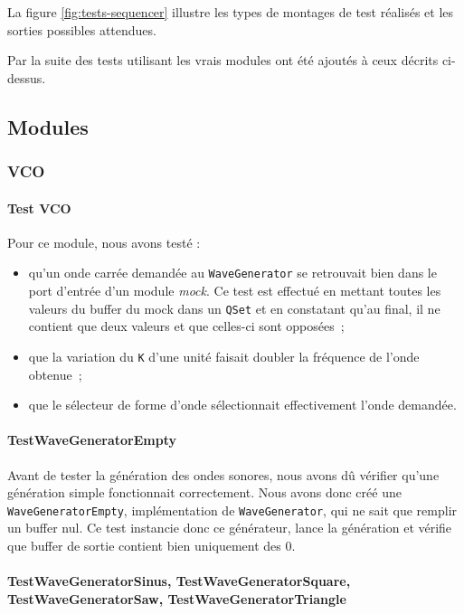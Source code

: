 La figure \ref{fig:tests-sequencer} illustre les types de montages de test réalisés et les sorties possibles
attendues.

Par la suite des tests utilisant les vrais modules ont été ajoutés à ceux décrits ci-dessus.

\subsection{Modules}


\subsubsection{VCO}

\paragraph{Test VCO}

Pour ce module, nous avons testé :
\begin{itemize}
    \item qu'un onde  carrée demandée au \texttt{WaveGenerator} se retrouvait bien dans le port d'entrée d'un module \textit{mock}. Ce test est effectué en mettant toutes les valeurs du buffer du mock dans un \verb!QSet! et en constatant qu'au final, il ne contient que deux valeurs et que celles-ci sont opposées~;
    \item que la variation du \texttt{K} d'une unité faisait doubler la fréquence de l'onde obtenue~;
    \item que le sélecteur de forme d'onde sélectionnait effectivement l'onde demandée.
\end{itemize}

\paragraph{TestWaveGeneratorEmpty}

Avant de tester la génération des ondes sonores, nous avons dû
vérifier qu'une génération simple fonctionnait correctement. Nous
avons donc créé une \verb!WaveGeneratorEmpty!, implémentation de
\verb!WaveGenerator!, qui ne sait que remplir un buffer nul. Ce
test instancie donc ce générateur, lance la génération et vérifie
que buffer de sortie contient bien uniquement des 0.

\paragraph{TestWaveGeneratorSinus, TestWaveGeneratorSquare, TestWaveGeneratorSaw, TestWaveGeneratorTriangle}

